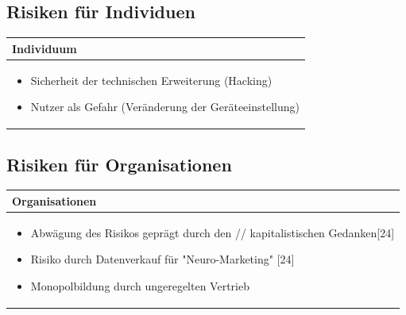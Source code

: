 \documentclass[aspectratio=169,16pt,xcolor=table]{beamer}
\begin{document}
\subsection{Risiken für Individuen}
\begin{frame} %
\centering
\renewcommand{\arraystretch}{1.5} %
\begin{tabular}{|p{12cm}|}
    \hline
    \rowcolor{blue!25}
    \textbf{Individuum} \\
    \hline
    \begin{itemize}
        \item Sicherheit der technischen Erweiterung (Hacking)
        \item Nutzer als Gefahr (Veränderung der Geräteeinstellung)
    \end{itemize} \\
    \hline
\end{tabular}
\end{frame}


\subsection{Risiken für Organisationen}

\begin{frame} %
\centering
\renewcommand{\arraystretch}{1.5} %
\begin{tabular}{|p{12cm}|}
    \hline
    \rowcolor{blue!25}
    \textbf{Organisationen} \\
    \hline
    \begin{itemize}
        \item Abwägung des Risikos geprägt durch den // kapitalistischen Gedanken[24]
        \item Risiko durch Datenverkauf für "Neuro-Marketing" [24]
        \item Monopolbildung durch ungeregelten Vertrieb
    \end{itemize} \\
    \hline
\end{tabular}

\end{frame}

\end{document}
